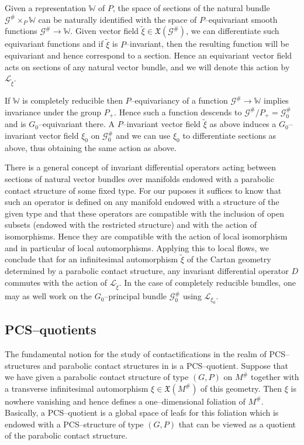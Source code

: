 \documentclass[12pt,a4paper]{amsart}
\def\frak{\mathfrak}
\def\Bbb{\mathbb}
\def\Cal{\mathcal}
\newcommand{\x}{\times}
\numberwithin{theorem}{section}
\theoremstyle{definition}
\theoremstyle{remark}
\begin{document}
Given a representation $\Bbb W$ of $P$, the space of sections of the
natural bundle $\Cal G^\#\x_P\Bbb W$ can be naturally identified with
the space of $P$--equivariant smooth functions $\Cal G^\#\to\Bbb
W$. Given vector field $\tilde\xi\in\frak X(\Cal G^\#)$, we can
differentiate such equivariant functions and if $\tilde\xi$ is
$P$--invariant, then the resulting function will be equivariant and
hence correspond to a section. Hence an equivariant vector field acts
on sections of any natural vector bundle, and we will denote this
action by $\Cal L_{\tilde\xi}$.

If $\Bbb W$ is completely reducible then $P$--equivariancy of a
function $\Cal G^\#\to\Bbb W$ implies invariance under the group
$P_+$. Hence such a function descends to $\Cal G^\#/P_+=\Cal G_0^\#$
and is $G_0$--equivariant there. A $P$--invariant vector field
$\tilde\xi$ as above induces a $G_0$--invariant vector field $\xi_0$
on $\Cal G_0^\#$ and we can use $\xi_0$ to differentiate sections as
above, thus obtaining the same action as above. 

There is a general concept of invariant differential operators acting
between sections of natural vector bundles over manifolds endowed with
a parabolic contact structure of some fixed type. For our puposes it
suffices to know that such an operator is defined on any manifold
endowed with a structure of the given type and that these operators
are compatible with the inclusion of open subsets (endowed with the
restricted structure) and with the action of isomorphisms. Hence they
are compatible with the action of local isomorphism and in particular
of local automorphisms. Applying this to local flows, we conclude that
for an infinitesimal automorphism $\tilde\xi$ of the Cartan geometry
determined by a parabolic contact structure, any invariant
differential operator $D$ commutes with the action of $\Cal
L_{\tilde\xi}$. In the case of completely reducible bundles, one may
as well work on the $G_0$--principal bundle $\Cal G^\#_0$ using $\Cal
L_{\xi_0}$.

\subsection{PCS--quotients}\label{2.3}

The fundamental notion for the study of contactifications in the realm
of PCS--structures and parabolic contact structures in \cite{PCS2} is
a PCS--quotient. Suppose that we have given a parabolic contact
structure of type $(G,P)$ on $M^\#$ together with a  transverse infinitesimal
automorphism $\xi\in\frak X(M^\#)$ of this geometry. Then $\xi$ is
nowhere vanishing and hence defines a one--dimensional foliation of
$M^\#$.  Basically, a PCS--quotient is a global space of leafs for
this foliation which is endowed with a PCS--structure of type $(G,P)$
that can be viewed as a quotient of the parabolic contact structure. 
\end{document}
